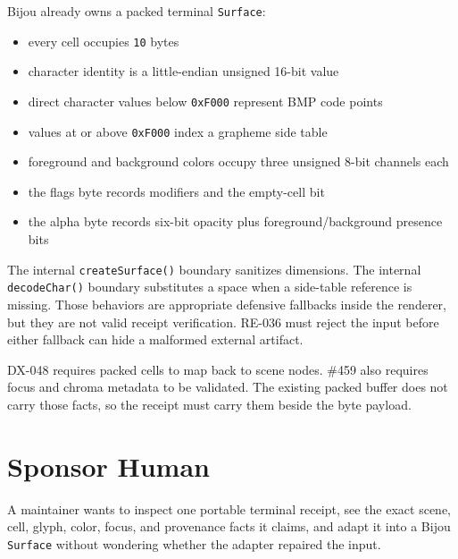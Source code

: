 Bijou already owns a packed terminal \texttt{S\allowbreak{}u\allowbreak{}r\allowbreak{}f\allowbreak{}a\allowbreak{}c\allowbreak{}e}:

\begin{itemize}
\tightlist
\item
  every cell occupies \texttt{1\allowbreak{}0} bytes
\item
  character identity is a little-endian unsigned 16-bit value
\item
  direct character values below \texttt{0\allowbreak{}x\allowbreak{}F\allowbreak{}0\allowbreak{}0\allowbreak{}0} represent BMP code points
\item
  values at or above \texttt{0\allowbreak{}x\allowbreak{}F\allowbreak{}0\allowbreak{}0\allowbreak{}0} index a grapheme side table
\item
  foreground and background colors occupy three unsigned 8-bit channels each
\item
  the flags byte records modifiers and the empty-cell bit
\item
  the alpha byte records six-bit opacity plus foreground/background presence bits
\end{itemize}

The internal \texttt{c\allowbreak{}r\allowbreak{}e\allowbreak{}a\allowbreak{}t\allowbreak{}e\allowbreak{}S\allowbreak{}u\allowbreak{}r\allowbreak{}f\allowbreak{}a\allowbreak{}c\allowbreak{}e\allowbreak{}(\allowbreak{})} boundary sanitizes dimensions. The internal \texttt{d\allowbreak{}e\allowbreak{}c\allowbreak{}o\allowbreak{}d\allowbreak{}e\allowbreak{}C\allowbreak{}h\allowbreak{}a\allowbreak{}r\allowbreak{}(\allowbreak{})} boundary substitutes a space when a side-table reference is missing. Those behaviors are appropriate defensive fallbacks inside the renderer, but they are not valid receipt verification. RE-036 must reject the input before either fallback can hide a malformed external artifact.

DX-048 requires packed cells to map back to scene nodes. \#459 also requires focus and chroma metadata to be validated. The existing packed buffer does not carry those facts, so the receipt must carry them beside the byte payload.

\section{Sponsor Human}\label{record-164-sponsor-human}

A maintainer wants to inspect one portable terminal receipt, see the exact scene, cell, glyph, color, focus, and provenance facts it claims, and adapt it into a Bijou \texttt{S\allowbreak{}u\allowbreak{}r\allowbreak{}f\allowbreak{}a\allowbreak{}c\allowbreak{}e} without wondering whether the adapter repaired the input.

